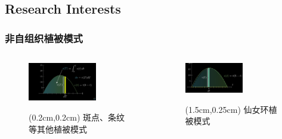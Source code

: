 \documentclass[aspectratio=169, 12pt, utf8, mathserif]{ctexbeamer} %
\begin{document}
\subsection{Research Interests}	
\begin{frame}
	\frametitle{非自组织植被模式}
	\begin{columns}
		\column{0.34\paperwidth}
		\hspace{5cm} %
		\vspace{-0.5cm} %
		\begin{figure}[tbph]
			\centering
			\includegraphics[width=0.7\textwidth]{figures/3}
			\begin{textblock*}{5cm}(0.2cm,0.2cm)
				\small 斑点、条纹等其他植被模式
			\end{textblock*}
		\end{figure}
		
		\vspace{-0.5cm} %
		\column{0.5\paperwidth}	
		\begin{figure}[tbph] %
			\centering
			\includegraphics[width=0.6\textwidth]{figures/2} %
			\begin{textblock*}{5cm}(1.5cm,0.25cm) %
				\small 仙女环植被模式
			\end{textblock*}
		\end{figure}
		
		\end{columns}
\end{frame}

%	
%		
%
\end{document}
